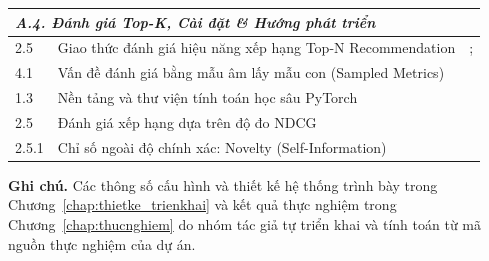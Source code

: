 \begin{longtable}{|p{}|p{}|p{}|}
\hline
\multicolumn{3}{|l|}{\textit{A.4. Đánh giá Top-K, Cài đặt \& Hướng phát triển}} \\
\hline
2.5 & Giao thức đánh giá hiệu năng xếp hạng Top-N Recommendation &
\textcite{cremonesi2010performance}; \textcite{he2017ncf} \\
\hline
4.1 & Vấn đề đánh giá bằng mẫu âm lấy mẫu con (Sampled Metrics) &
\textcite{krichene2020sampled} \\
\hline
1.3 & Nền tảng và thư viện tính toán học sâu PyTorch &
\textcite{paszke2019pytorch} \\
\hline
2.5 & Đánh giá xếp hạng dựa trên độ đo NDCG &
\textcite{jarvelin2002} \\
\hline
2.5.1 & Chỉ số ngoài độ chính xác: Novelty (Self-Information) &
\textcite{vargas2011novelty} \\
\hline
\end{longtable}

\vspace{0.5\baselineskip}
\noindent\textbf{Ghi chú.} Các thông số cấu hình và thiết kế hệ thống trình bày trong Chương~\ref{chap:thietke_trienkhai} và kết quả thực nghiệm trong Chương~\ref{chap:thucnghiem} do nhóm tác giả tự triển khai và tính toán từ mã nguồn thực nghiệm của dự án.